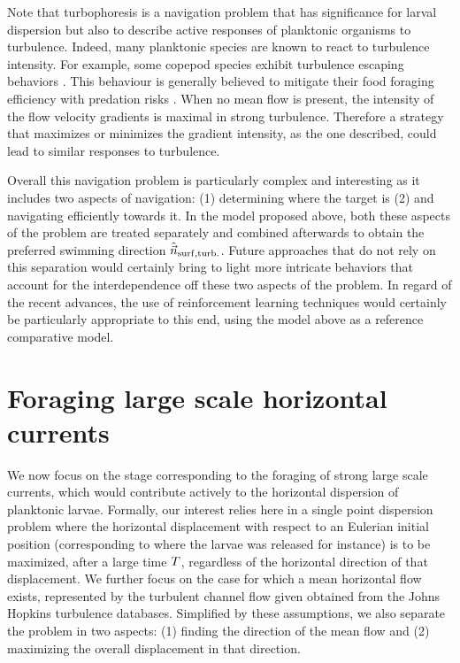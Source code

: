 Note that turbophoresis is a navigation problem that has significance for larval dispersion but also to describe active responses of planktonic organisms to turbulence.
Indeed, many planktonic species are known to react to turbulence intensity.
For example, some copepod species exhibit turbulence escaping behaviors \citep{visser2001observations, schmitt2011direct}.
This behaviour is generally believed to mitigate their food foraging efficiency with predation risks \citep{visser2009swimming}.
When no mean flow is present, the intensity of the flow velocity gradients is maximal in strong turbulence.
Therefore a strategy that maximizes or minimizes the gradient intensity, as the one described, could lead to similar responses to turbulence.

Overall this navigation problem is particularly complex and interesting as it includes two aspects of navigation: (1) determining where the target is (2) and navigating efficiently towards it.
In the model proposed above, both these aspects of the problem are treated separately and combined afterwards to obtain the preferred swimming direction $\hat{\vec{n}}_{\mathrm{surf}, \mathrm{turb.}}$.
Future approaches that do not rely on this separation would certainly bring to light more intricate behaviors that account for the interdependence off these two aspects of the problem.
In regard of the recent advances, the use of reinforcement learning techniques would certainly be particularly appropriate to this end, using the model above as a reference comparative model.

\section{Foraging large scale horizontal currents}

We now focus on the stage corresponding to the foraging of strong large scale currents, which would contribute actively to the horizontal dispersion of planktonic larvae.
Formally, our interest relies here in a single point dispersion problem where the horizontal displacement with respect to an Eulerian initial position (corresponding to where the larvae was released for instance) is to be maximized, after a large time $T$, regardless of the horizontal direction of that displacement.
We further focus on the case for which a mean horizontal flow exists, represented by the turbulent channel flow given obtained from the Johns Hopkins turbulence databases. 
Simplified by these assumptions, we also separate the problem in two aspects: (1) finding the direction of the mean flow and (2) maximizing the overall displacement in that direction.

